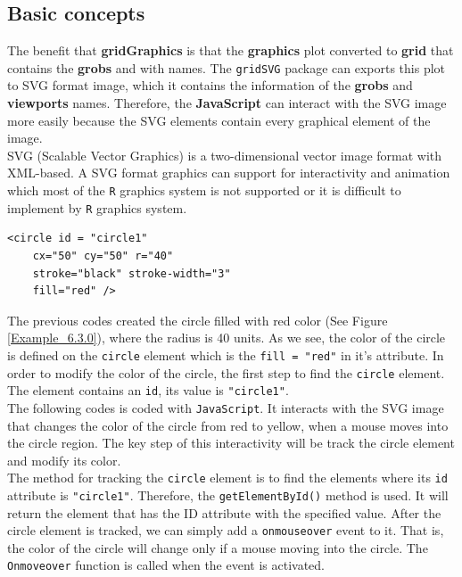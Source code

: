\documentclass[paper=a4, fontsize=11pt]{report}
\begin{document}
\subsection{Basic concepts}
The benefit that \textbf{gridGraphics} is that the \textbf{graphics} plot converted to \textbf{grid} that contains the \textbf{grobs} and  with names. The \texttt{gridSVG} package can exports this plot to SVG format image, which it contains the information of the \textbf{grobs} and \textbf{viewports} names. Therefore, the \textbf{JavaScript} can interact with the SVG image more easily because the SVG elements contain every graphical element of the image.\\

SVG (Scalable Vector Graphics) is a two-dimensional vector image format with XML-based. A SVG format graphics can support for interactivity and animation which most of the \texttt{R} graphics system is not supported or it is difficult to implement by \texttt{R} graphics system.\\

\begin{lstlisting}
<circle id = "circle1" 
    cx="50" cy="50" r="40" 
    stroke="black" stroke-width="3" 
    fill="red" />
\end{lstlisting}

The previous codes created the circle filled with red color (See Figure \ref{Example_6.3.0}), where the radius is 40 units. As we see, the color of the circle is defined on the \texttt{circle} element which is the \texttt{fill = "red"} in it's attribute. In order to modify the color of the circle, the first step to find the \texttt{circle} element. The element contains an \texttt{id}, its value is \texttt{"circle1"}.\\

The following codes is coded with \texttt{JavaScript}. It interacts with the SVG image that changes the color of the circle from red to yellow, when a mouse moves into the circle region. The key step of this interactivity will be track the circle element and modify its color.\\

The method for tracking the \texttt{circle} element is to find the elements where its \texttt{id} attribute is \texttt{"circle1"}. Therefore, the \texttt{getElementById()} method is used. It will return the element that has the ID attribute with the specified value. After the circle element is tracked, we can simply add a \texttt{onmouseover} event to it. That is, the color of the circle will change only if a mouse moving into the circle. The \texttt{Onmoveover} function is called when the event is activated.\\ 
\end{document}
